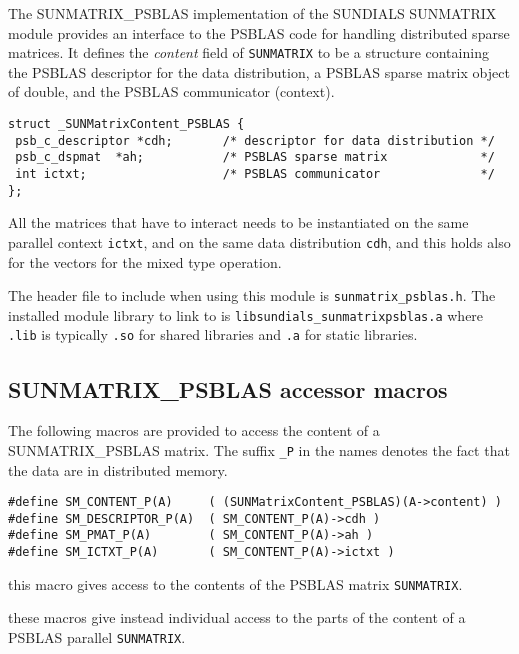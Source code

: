 \documentclass[twoside,a4paper]{refart}
\begin{document}
The SUNMATRIX\_PSBLAS implementation of the SUNDIALS SUNMATRIX module provides an interface to the PSBLAS code for handling distributed sparse matrices. 
It defines the \emph{content} field of \texttt{SUNMATRIX} to be a structure containing the PSBLAS descriptor for the data distribution, a PSBLAS sparse matrix object of double, and the PSBLAS communicator (context).

\begin{lstlisting}[style=CStyle]
struct _SUNMatrixContent_PSBLAS {
 psb_c_descriptor *cdh;       /* descriptor for data distribution */
 psb_c_dspmat  *ah;           /* PSBLAS sparse matrix             */
 int ictxt;                   /* PSBLAS communicator              */
};
\end{lstlisting}

\attention All the matrices that have to interact needs to be instantiated on the same parallel context \lstinline[style=CStyle]|ictxt|, and on the same data distribution \lstinline[style=CStyle]|cdh|, and this holds also for the vectors for the mixed type operation.


The header file to include when using this module is \texttt{sunmatrix\_psblas.h}. The installed module library to link to is \texttt{libsundials\_sunmatrixpsblas.a} where \texttt{.lib} is typically \texttt{.so} for shared libraries and \texttt{.a} for static libraries.

\subsection{SUNMATRIX\_PSBLAS accessor macros}

The following macros are provided to access the content of a SUNMATRIX\_PSBLAS matrix. The suffix \texttt{\_P} in the names denotes the fact that the data are in distributed memory.

\begin{lstlisting}[style=CStyle]
#define SM_CONTENT_P(A)     ( (SUNMatrixContent_PSBLAS)(A->content) )
#define SM_DESCRIPTOR_P(A)  ( SM_CONTENT_P(A)->cdh )
#define SM_PMAT_P(A)        ( SM_CONTENT_P(A)->ah )
#define SM_ICTXT_P(A)       ( SM_CONTENT_P(A)->ictxt )
\end{lstlisting}

 this macro gives access to the contents of the PSBLAS matrix \texttt{SUNMATRIX}.

 these macros give instead individual access to the parts of the content of a PSBLAS parallel \texttt{SUNMATRIX}.
\end{document}
